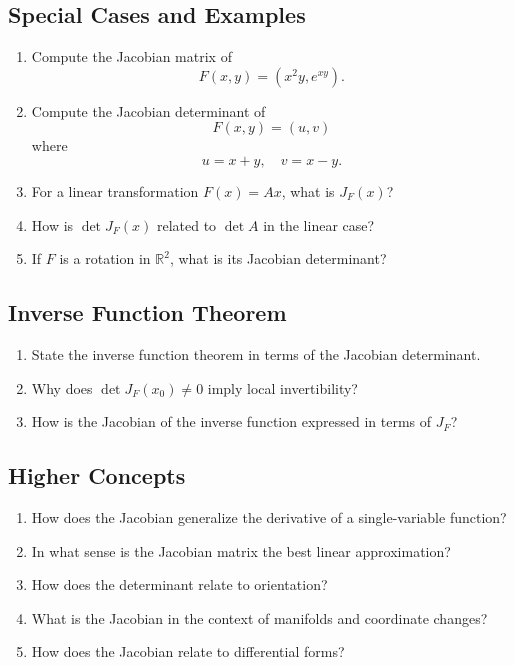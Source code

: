 \subsection{Special Cases and Examples}

\begin{enumerate}[resume]
  \item Compute the Jacobian matrix of
    \[
      F(x,y) = (x^2 y, e^{xy}).
    \]
  \item Compute the Jacobian determinant of
    \[
      F(x,y) = (u,v)
    \]
    where
    \[
      u = x+y, \quad v = x-y.
    \]
  \item For a linear transformation $F(x)=Ax$, what is $J_F(x)$?
  \item How is $\det J_F(x)$ related to $\det A$ in the linear case?
  \item If $F$ is a rotation in $\mathbb{R}^2$, what is its Jacobian determinant?
\end{enumerate}

\subsection{Inverse Function Theorem}

\begin{enumerate}[resume]
  \item State the inverse function theorem in terms of the Jacobian determinant.
  \item Why does $\det J_F(x_0) \neq 0$ imply local invertibility?
  \item How is the Jacobian of the inverse function expressed in terms of $J_F$?
\end{enumerate}

\subsection{Higher Concepts}

\begin{enumerate}[resume]
  \item How does the Jacobian generalize the derivative of a single-variable function?
  \item In what sense is the Jacobian matrix the best linear approximation?
  \item How does the determinant relate to orientation?
  \item What is the Jacobian in the context of manifolds and coordinate changes?
  \item How does the Jacobian relate to differential forms?
\end{enumerate}
